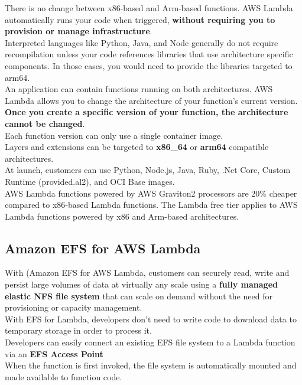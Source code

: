 \documentclass[12pt, letterpaper, twoside]{article}
\begin{document}
There is no change between x86-based and Arm-based functions. AWS Lambda automatically runs your code when triggered, 
\textbf{without requiring you to provision or manage infrastructure}.\\

Interpreted languages like Python, Java, and Node generally do not require recompilation unless your code references 
libraries that use architecture specific components. In those cases, you would need to provide the libraries targeted 
to arm64.\\

An application can contain functions running on both architectures. AWS Lambda allows you to change the architecture 
of your function’s current version. 
\textbf{Once you create a specific version of your function, the architecture cannot be changed}.\\
Each function version can only use a single container image.\\
Layers and extensions can be targeted to \textbf{x86\_64} or \textbf{arm64} compatible architectures.\\

At launch, customers can use Python, Node.js, Java, Ruby, .Net Core, Custom Runtime (provided.al2), and OCI Base images.\\

AWS Lambda functions powered by AWS Graviton2 processors are 20\% cheaper compared to x86-based Lambda functions. The Lambda 
free tier applies to AWS Lambda functions powered by x86 and Arm-based architectures.\\

\subsection{Amazon EFS for AWS Lambda}
With (Amazon EFS for AWS Lambda, customers can securely read, write and persist large volumes of data at virtually any scale 
using a \textbf{fully managed elastic NFS file system} that can scale on demand without the need for provisioning or capacity 
management.\\
With EFS for Lambda, developers don't need to write code to download data to temporary storage in order to process it.\\

Developers can easily connect an existing EFS file system to a Lambda function via an \textbf{EFS Access Point}\\
When the function is first invoked, the file system is automatically mounted and made available to function code.\\
\end{document}
